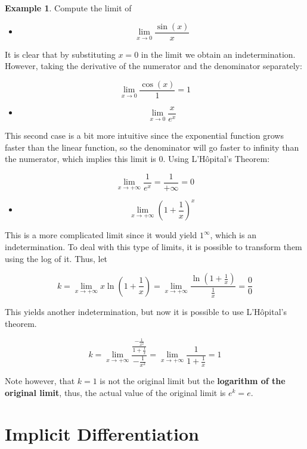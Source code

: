 \documentclass[a4paper,11pt]{article}
\theoremstyle{definition}
\newtheorem{example}{Example}
\theoremstyle{plain}
\begin{document}
\begin{example}
Compute the limit of

\begin{itemize}
\item
  \[\lim_{x\rightarrow 0}{\frac{\sin(x)}{x}}\]
\end{itemize}

It is clear that by substituting \(x = 0\) in the limit we obtain an
indetermination. However, taking the derivative of the numerator and the
denominator separately:

\[
\lim_{x\rightarrow 0}{\frac{\cos(x)}{1}} = 1
\]

\begin{itemize}
\item
  \[\lim_{x\rightarrow 0}{\frac{x}{e^x}}\]
\end{itemize}

This second case is a bit more intuitive since the exponential function
grows faster than the linear function, so the denominator will go faster
to infinity than the numerator, which implies this limit is \(0\). Using
L'Hôpital's Theorem:

\[
\lim_{x\rightarrow +\infty}{\frac{1}{e^x}} = \frac{1}{+\infty} = 0
\]

\begin{itemize}
\item
  \[\lim_{x\rightarrow +\infty}{\left(1 + \frac{1}{x}\right)^x}\]
\end{itemize}

This is a more complicated limit since it would yield \(1^{\infty}\),
which is an indetermination. To deal with this type of limits, it is
possible to transform them using the log of it. Thus, let

\[
k = \lim_{x\rightarrow +\infty}{x\ln\left(1 + \frac{1}{x}\right)} = \lim_{x\rightarrow +\infty}{\frac{\ln\left(1 + \frac{1}{x}\right)}{\frac{1}{x}}} = \frac{0}{0}
\]

This yields another indetermination, but now it is possible to use
L'Hôpital's theorem.

\[
k = \lim_{x\rightarrow +\infty}{\frac{\frac{-\frac{1}{x^2}}{1 + \frac{1}{x}}}{-\frac{1}{x^2}}} = \lim_{x\rightarrow +\infty}{\frac{1}{1 + \frac{1}{x}}} = 1
\]

Note however, that \(k = 1\) is not the original limit but the
\textbf{logarithm of the original limit}, thus, the actual value of the
original limit is \(e^k = e\).
\end{example}

\section{Implicit Differentiation}\label{implicit-differentiation}
\end{document}
